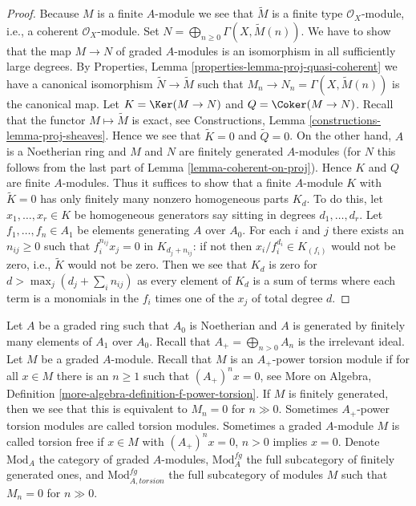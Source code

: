 \begin{proof}
Because $M$ is a finite $A$-module we see that
$\widetilde{M}$ is a finite type $\mathcal{O}_X$-module,
i.e., a coherent $\mathcal{O}_X$-module.
Set $N = \bigoplus_{n \geq 0} \Gamma(X, \widetilde{M}(n))$.
We have to show that the map $M \to N$ of graded $A$-modules
is an isomorphism in all sufficiently large degrees.
By Properties, Lemma \ref{properties-lemma-proj-quasi-coherent}
we have a canonical isomorphism $\widetilde{N} \to \widetilde{M}$
such that $M_n \to N_n = \Gamma(X, \widetilde{M}(n))$
is the canonical map. Let $K = \Ker(M \to N)$ and $Q = \Coker(M \to N)$.
Recall that the functor
$M \mapsto \widetilde{M}$ is exact, see
Constructions, Lemma \ref{constructions-lemma-proj-sheaves}.
Hence we see that $\widetilde{K} = 0$ and $\widetilde{Q} = 0$.
On the other hand, $A$ is a Noetherian ring and $M$ and $N$
are finitely generated $A$-modules (for $N$ this follows from
the last part of Lemma \ref{lemma-coherent-on-proj}).
Hence $K$ and $Q$ are finite $A$-modules. Thus it suffices to show
that a finite $A$-module $K$ with $\widetilde{K} = 0$
has only finitely many nonzero homogeneous parts $K_d$.
To do this, let $x_1, \ldots, x_r \in K$ be homogeneous generators
say sitting in degrees $d_1, \ldots, d_r$.
Let $f_1, \ldots, f_n \in A_1$ be elements generating $A$ over $A_0$.
For each $i$ and $j$ there exists an $n_{ij} \geq 0$ such that
$f_i^{n_{ij}} x_j = 0$ in $K_{d_j + n_{ij}}$: if not then
$x_i/f_i^{d_i} \in K_{(f_i)}$ would not be zero, i.e., $\widetilde{K}$
would not be zero.
Then we see that $K_d$ is zero for $d > \max_j(d_j + \sum_i n_{ij})$
as every element of $K_d$ is a sum of terms where each term is a
monomials in the $f_i$ times one of the $x_j$ of total degree $d$.
\end{proof}

\noindent
Let $A$ be a graded ring such that $A_0$ is Noetherian and $A$ is generated
by finitely many elements of $A_1$ over $A_0$. Recall that
$A_+ = \bigoplus_{n > 0} A_n$ is the irrelevant ideal.
Let $M$ be a graded $A$-module. Recall that
$M$ is an $A_+$-power torsion module if for all $x \in M$
there is an $n \geq 1$ such that $(A_+)^n x = 0$, see
More on Algebra, Definition \ref{more-algebra-definition-f-power-torsion}.
If $M$ is finitely generated, then we see that
this is equivalent to $M_n = 0$ for $n \gg 0$.
Sometimes $A_+$-power torsion modules are called torsion modules.
Sometimes a graded $A$-module $M$ is called torsion free if
$x \in M$ with $(A_+)^n x = 0$, $n > 0$ implies $x = 0$.
Denote $\text{Mod}_A$ the category of graded $A$-modules,
$\text{Mod}^{fg}_A$ the full subcategory of finitely generated ones,
and $\text{Mod}^{fg}_{A, torsion}$ the full subcategory of
modules $M$ such that $M_n = 0$ for $n \gg 0$.

